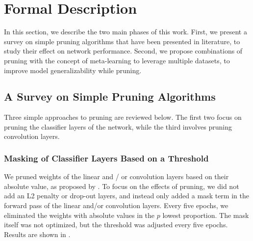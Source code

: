 \documentclass{article}
\begin{document}
\section{Formal Description}

In this section, we describe the two main phases of this work. First, we present a survey on simple pruning algorithms that have been presented in literature, to study their effect on network performance. Second, we propose combinations of pruning with the concept of meta-learning to leverage multiple datasets, to improve model generalizability while pruning.

\subsection{A Survey on Simple Pruning Algorithms}

Three simple approaches to pruning are reviewed below. The first two focus on pruning the classifier layers of the network, while the third involves pruning convolution layers.

\subsubsection{Masking of Classifier Layers Based on a Threshold} \label{MaskClass}

We pruned weights of the linear and / or convolution layers based on their absolute value, as proposed by \citet{NIPS_learning_weights_pruning}. To focus on the effects of pruning, we did not add an L2 penalty or drop-out layers, and instead only added a mask term in the forward pass of the linear and/or convolution layers. Every five epochs, we eliminated the weights with absolute values in the $p$ lowest proportion. The mask itself was not optimized, but the threshold was adjusted every five epochs. Results are shown in .
\end{document}
